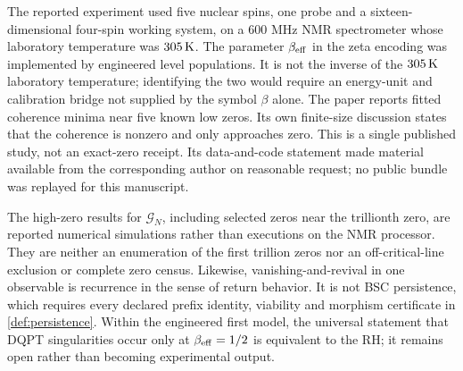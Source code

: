 \documentclass[11pt,a4paper]{article}
\theoremstyle{definition}
\theoremstyle{plain}
\theoremstyle{remark}
\begin{document}
The reported experiment used five nuclear spins, one probe and a
sixteen-dimensional four-spin working system, on a 600 MHz NMR spectrometer
whose laboratory temperature was \(305\,{\rm K}\).  The parameter
\(\beta_{\rm eff}\) in the zeta encoding was implemented by engineered level
populations.  It is not the inverse of the \(305\,{\rm K}\) laboratory
temperature; identifying the two would require an energy-unit and calibration
bridge not supplied by the symbol \(\beta\) alone.  The paper reports fitted
coherence minima near five known low zeros.  Its own finite-size discussion
states that the coherence is nonzero and only approaches zero.  This is a
single published study, not an exact-zero receipt.  Its data-and-code statement
made material available from the corresponding author on reasonable request;
no public bundle was replayed for this manuscript.

The high-zero results for \(\mathcal G_N\), including selected zeros near the
trillionth zero, are reported numerical simulations rather than executions on
the NMR processor.  They are neither an enumeration of the first trillion
zeros nor an off-critical-line exclusion or complete zero census.  Likewise,
vanishing-and-revival in one observable is recurrence in the sense of return
behavior.  It is not BSC persistence, which requires every declared prefix
identity, viability and morphism certificate in \cref{def:persistence}.
Within the engineered first model, the universal statement that DQPT
singularities occur only at \(\beta_{\rm eff}=1/2\) is equivalent to the RH;
it remains open rather than becoming experimental output.
\end{document}
